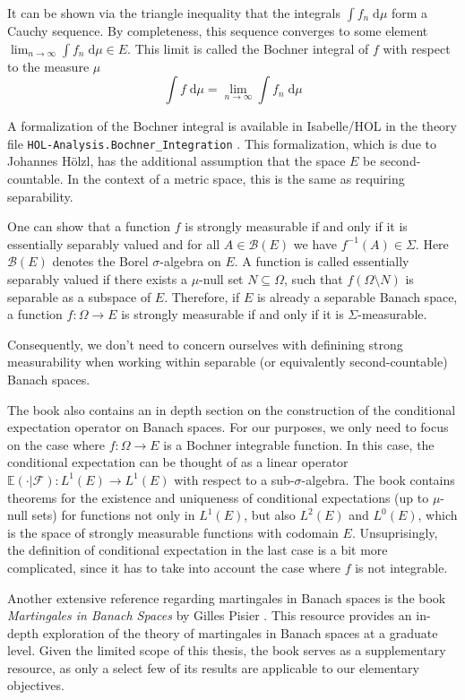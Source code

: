 It can be shown via the triangle inequality that the integrals $\int f_n\; \textrm{d}\mu$ form a Cauchy sequence. By completeness, this sequence converges to some element $\lim_{n \to \infty} \int f_n \; \textrm{d}\mu \in E$. This limit is called the Bochner integral of $f$ with respect to the measure $\mu$
\[
	\int f \; \textrm{d}\mu = \lim_{n \to \infty} \int f_n \; \textrm{d}\mu
\]
\vspace{0.3cm}
\relax
{}\relax

A formalization of the Bochner integral is available in Isabelle/HOL in the theory file \texttt{HOL-Analysis.Bochner\_Integration} \cite{hoelzl2011measuretheory}. This formalization, which is due to Johannes Hölzl, has the additional assumption that the space $E$ be second-countable. In the context of a metric space, this is the same as requiring separability.
\vspace{0.3cm}
\begin{remark}

One can show that a function $f$ is strongly measurable if and only if it is essentially separably valued and for all $A \in \mathcal{B}(E)$ we have $f^{-1}(A) \in \Sigma$. Here $\mathcal{B}(E)$ denotes the Borel $\sigma$-algebra on $E$. A function is called essentially separably valued if there exists a $\mu$-null set $N \subseteq \Omega$, such that $f (\Omega \setminus N)$ is separable as a subspace of $E$. Therefore, if $E$ is already a separable Banach space, a function $f : \Omega \rightarrow E$ is strongly measurable if and only if it is $\Sigma$-measurable.

Consequently, we don't need to concern ourselves with definining strong measurability when working within separable (or equivalently second-countable) Banach spaces.
\end{remark}
\vspace{0.3cm}

The book also contains an in depth section on the construction of the conditional expectation operator on Banach spaces. For our purposes, we only need to focus on the case where $f : \Omega \rightarrow E$ is a Bochner integrable function. In this case, the conditional expectation can be thought of as a linear operator $\mathbb{E}(\cdot\vert\mathcal{F}) : L^1(E) \rightarrow L^1(E)$ with respect to a sub-$\sigma$-algebra. The book contains theorems for the existence and uniqueness of conditional expectations (up to $\mu$-null sets) for functions not only in $L^1(E)$, but also $L^2(E)$ and $L^0(E)$, which is the space of strongly measurable functions with codomain $E$. Unsuprisingly, the definition of conditional expectation in the last case is a bit more complicated, since it has to take into account the case where $f$ is not integrable.

Another extensive reference regarding martingales in Banach spaces is the book \textit{Martingales in Banach Spaces} by Gilles Pisier \cite{pisier_2016}. This resource provides an in-depth exploration of the theory of martingales in Banach spaces at a graduate level. Given the limited scope of this thesis, the book serves as a supplementary resource, as only a select few of its results are applicable to our elementary objectives.
